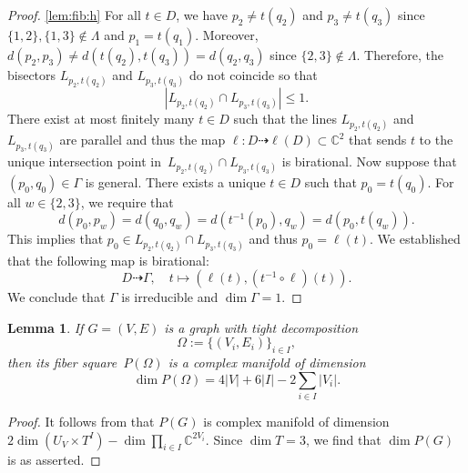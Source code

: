\documentclass[12pt]{article}
\newtheorem{lemma}{Lemma}
\theoremstyle{definition}
\newcommand{\st}{such that }
\renewcommand{\c}{\colon}
\newcommand{\dto}{\dasharrow}
\newcommand{\C}{{\mathbb{C}}}
\newcommand{\sd}{d} %
\begin{document}
\begin{proof}
\ref{lem:fib:h}
For all $t\in D$, we have $p_2\neq t(q_2)$ and $p_3\neq t(q_3)$
since $\{1,2\},\{1,3\}\notin \Lambda$ and $p_1=t(q_1)$.
Moreover, $\sd(p_2,p_3)\neq\sd(t(q_2),t(q_3))=\sd(q_2,q_3)$ since $\{2,3\}\notin\Lambda$.
Therefore, the bisectors $L_{p_2,t(q_2)}$ and $L_{p_3,t(q_3)}$ do not coincide so that
\[
|L_{p_2,t(q_2)}\cap L_{p_3,t(q_3)}|\leq 1.
\]
There exist at most finitely many $t\in D$ such that the
lines $L_{p_2,t(q_2)}$ and $L_{p_3,t(q_3)}$
are parallel and thus the map $\ell\c D\dto \ell(D)\subset\C^2$
that sends $t$ to the unique intersection point in~$L_{p_2,t(q_2)}\cap L_{p_3,t(q_3)}$
is birational.
Now suppose that $(p_0,q_0)\in\Gamma$ is general.
There exists a unique $t\in D$ \st $p_0=t(q_0)$.
For all $w\in\{2,3\}$, we require that
\[
\sd(p_0,p_w)=\sd(q_0,q_w)=\sd(t^{-1}(p_0),q_w)=\sd(p_0,t(q_w)).
\]
This implies that $p_0\in L_{p_2,t(q_2)}\cap L_{p_3,t(q_3)}$ and thus $p_0=\ell(t)$.
We established that the following map is birational:
\[
D\dto \Gamma,\quad t\mapsto (\ell(t),(t^{-1}\circ\ell)(t)).
\]
We conclude that $\Gamma$ is irreducible and $\dim\Gamma=1$.
\end{proof}


\begin{lemma}
\label{lem:dim}
If $G=(V,E)$ is a graph with
tight decomposition
\[
\Omega:=\{(V_i,E_i)\}_{i\in I},
\]
then its fiber square~$P(\Omega)$ is a complex manifold of dimension
\[
\dim P(\Omega)=4|V|+6|I|-2\sum_{i\in I}|V_i|.
\]
\end{lemma}

\begin{proof}
It follows from  that
$P(G)$ is complex manifold of dimension
$2\dim(U_V\times T^I)-\dim\prod_{i\in I}\C^{2V_i}$.
Since $\dim T=3$, we find that $\dim P(G)$ is as asserted.
\end{proof}
\end{document}

